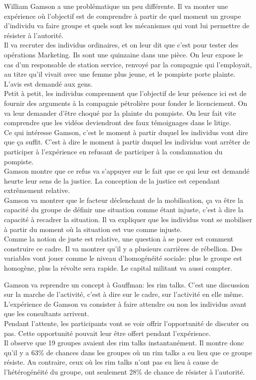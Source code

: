 \documentclass[10pt, a4paper, openany]{book}
\begin{document}
William Gamson a une problématique un peu différente. Il va monter une expérience où l'objectif est de comprendre à partir de quel moment un groupe d'individu va faire groupe et quels sont les mécanismes qui vont lui permettre de résister à l'autorité. \\
Il va recruter des individus ordinaires, et on leur dit que c'est pour tester des opérations Marketing. Ils sont une quinzaine dans une pièce. On leur expose le cas d'un responsable de station service, renvoyé par la compagnie qui l'employait, au titre qu'il vivait avec une femme plus jeune, et le pompiste porte plainte. L'avis est demandé aux gens. \\
Petit à petit, les individus comprennent que l'objectif de leur présence ici est de fournir des arguments à la compagnie pétrolière pour fonder le licenciement. On va leur demander d'être choqué par la plainte du pompiste. On leur fait vite comprendre que les vidéos deviendront des faux témoignages dans le litige. \\
Ce qui intéresse Gamson, c'est le moment à partir duquel les individus vont dire que ça suffit. C'est à dire le moment à partir duquel les individus vont arrêter de participer à l'expérience en refusant de participer à la condamnation du pompiste. \\
Gamson montre que ce refus va s'appuyer sur le fait que ce qui leur est demandé heurte leur sens de la justice. La conception de la justice est cependant extrêmement relative. \\
Gamson va montrer que le facteur déclenchant de la mobilisation, ça va être la capacité du groupe de définir une situation comme étant injuste, c'est à dire la capacité à recadrer la situation. Il va expliquer que les individus vont se mobiliser à partir du moment où la situation est vue comme injuste. \\
Comme la notion de juste est relative, une question à se poser est comment construire ce cadre. Il va montrer qu'il y a plusieurs carrières de rébellion. Des variables vont jouer comme le niveau d'homogénéité sociale: plus le groupe est homogène, plus la révolte sera rapide. Le capital militant va aussi compter.


Gamson va reprendre un concept à Gauffman: les rim talks. C'est une discussion sur la marche de l'activité, c'est à dire sur le cadre, sur l'activité en elle même. L'expérience de Gamson va consister à faire attendre ou non les individus avant que les consultants arrivent. \\
Pendant l'attente, les participants vont se voir offrir l'opportunité de discuter ou pas. Cette opportunité pouvait leur être offert pendant l'expérience. \\
Il observe que 19 groupes avaient des rim talks instantanément. Il montre donc qu'il y a 63\% de chances dans les groupes où un rim talks a eu lieu que ce groupe résiste. Au contraire, ceux où les rim talks n'ont pas eu lieu à cause de l'hétérogénéité du groupe, ont seulement 28\% de chance de résister à l'autorité.
\end{document}
